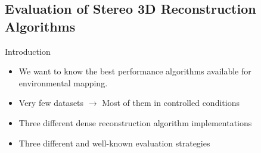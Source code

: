 \graphicspath{
  {./images/bmps/}{./images/vects/}{./images/}
  {./images/presentation/bmps/}{./images/presentation/vects/}{./images/presentation/}
  {./images/chapter00/bmps/}{./images/chapter00/vects/}{./images/chapter00/}
  {./images/chapter03/bmps/}{./images/chapter03/vects/}{./images/chapter03/}
}

\subsection{Evaluation of Stereo 3D Reconstruction Algorithms}
\begin{frame}{Introduction}
  \begin{itemize}
    \item We want to know the best performance algorithms available for environmental mapping.
    \item Very few datasets $\rightarrow$ Most of them in controlled conditions
    \item Three different dense reconstruction algorithm implementations
    \item Three different and well-known evaluation strategies
  \end{itemize}
  
\end{frame}

